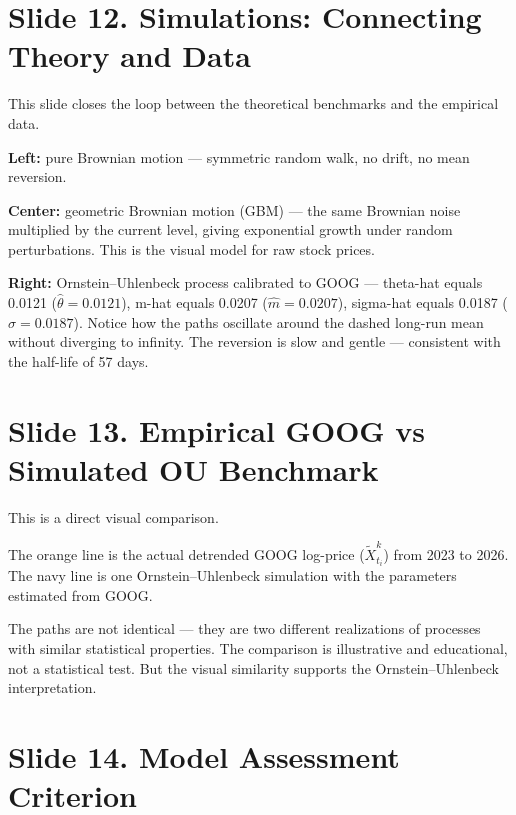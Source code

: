 \documentclass[12pt,a4paper]{article}
\begin{document}
\section{Slide 12. Simulations: Connecting Theory and Data}

This slide closes the loop between the theoretical benchmarks and the empirical data.

\textbf{Left:} pure Brownian motion --- symmetric random walk,
no drift, no mean reversion.

\textbf{Center:} geometric Brownian motion (GBM) ---
the same Brownian noise multiplied by the current level,
giving exponential growth under random perturbations.
This is the visual model for raw stock prices.

\textbf{Right:} Ornstein--Uhlenbeck process calibrated to GOOG ---
theta-hat equals 0.0121 ($\hat\theta = 0.0121$),
m-hat equals 0.0207 ($\hat m = 0.0207$),
sigma-hat equals 0.0187 ($\hat\sigma = 0.0187$).
Notice how the paths oscillate around the dashed long-run mean
without diverging to infinity.
The reversion is slow and gentle --- consistent with the half-life of 57 days.

\section{Slide 13. Empirical GOOG vs Simulated OU Benchmark}

This is a direct visual comparison.

The orange line is the actual detrended GOOG log-price
($\widetilde{X}_{t_i}^k$) from 2023 to 2026.
The navy line is one Ornstein--Uhlenbeck simulation
with the parameters estimated from GOOG.

The paths are not identical --- they are two different realizations of processes
with similar statistical properties.
The comparison is illustrative and educational, not a statistical test.
But the visual similarity supports the Ornstein--Uhlenbeck interpretation.

\section{Slide 14. Model Assessment Criterion}
\end{document}
